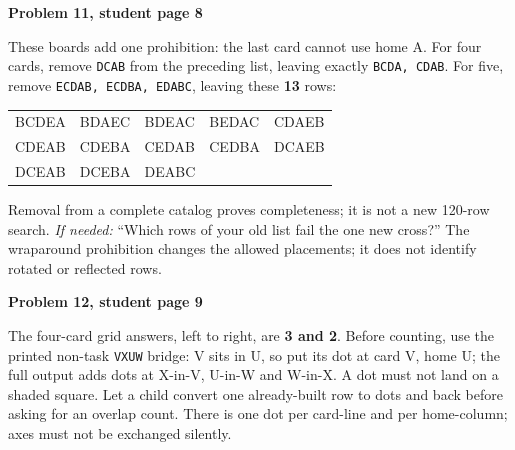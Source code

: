 \documentclass[11pt]{article}
\newcommand{\sub}[1]{\par\textbf{#1}\par}
\newcommand{\row}[1]{\texttt{#1}}
\newcommand{\hint}[1]{\emph{If needed:} #1}
\begin{document}
\sub{Problem 11, student page 8}
These boards add one prohibition: the last card cannot use home A. For four cards, remove \row{DCAB} from the preceding list, leaving exactly \row{BCDA, CDAB}. For five, remove \row{ECDAB, ECDBA, EDABC}, leaving these \textbf{13} rows:
\begin{center}\ttfamily\small
\begin{tabular}{lllll}
BCDEA&BDAEC&BDEAC&BEDAC&CDAEB\\
CDEAB&CDEBA&CEDAB&CEDBA&DCAEB\\
DCEAB&DCEBA&DEABC&&
\end{tabular}
\end{center}
Removal from a complete catalog proves completeness; it is not a new 120-row search. \hint{``Which rows of your old list fail the one new cross?''} The wraparound prohibition changes the allowed placements; it does not identify rotated or reflected rows.

\sub{Problem 12, student page 9}
The four-card grid answers, left to right, are \textbf{3 and 2}. Before counting, use the printed non-task \row{VXUW} bridge: V sits in U, so put its dot at card V, home U; the full output adds dots at X-in-V, U-in-W and W-in-X. A dot must not land on a shaded square. Let a child convert one already-built row to dots and back before asking for an overlap count. There is one dot per card-line and per home-column; axes must not be exchanged silently.
\end{document}
